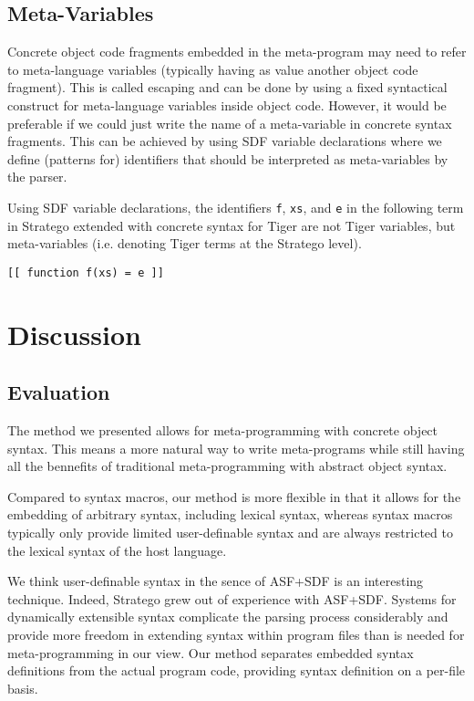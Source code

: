 \documentclass[a4paper,11pt]{article}
\begin{document}
\subsection{Meta-Variables}

Concrete object code fragments embedded in the meta-program may need to refer to
meta-language variables (typically having as value another object code fragment).
This is called escaping and can be done by using a fixed syntactical construct
for meta-language variables inside object code.
However, it would be preferable if we could just write the name of a meta-variable
in concrete syntax fragments. This can be achieved by using SDF variable
declarations where we define (patterns for) identifiers that should be interpreted
as meta-variables by the parser.

Using SDF variable declarations, the identifiers \texttt{f}, \texttt{xs}, and \texttt{e}
in the following term in Stratego extended with concrete syntax for Tiger are not
Tiger variables, but meta-variables (i.e. denoting Tiger terms at the Stratego
level).
\begin{lstlisting}[title=Implicit meta-variables]
[[ function f(xs) = e ]]
\end{lstlisting}


\section{Discussion}\label{sec:discussion}

\subsection{Evaluation}

The method we presented allows for meta-programming with concrete object syntax.
This means a more natural way to write meta-programs while still having all the
bennefits of traditional meta-programming with abstract object syntax.

Compared to syntax macros, our method is more flexible in that it allows for the
embedding of arbitrary syntax, including lexical syntax, whereas syntax macros
typically only provide limited user-definable syntax and are always restricted
to the lexical syntax of the host language.

We think user-definable syntax in the sence of ASF+SDF is an interesting
technique. Indeed, Stratego grew out of experience with ASF+SDF. Systems for
dynamically extensible syntax complicate the parsing process considerably and
provide more freedom in extending syntax within program files than is needed
for meta-programming in our view. Our method separates embedded syntax
definitions from the actual program code, providing syntax definition on a
per-file basis.
\end{document}
